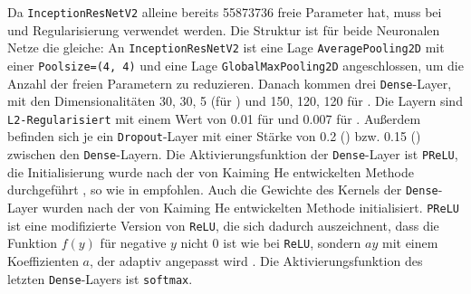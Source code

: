 Da \texttt{InceptionResNetV2} alleine bereits 55873736 freie Parameter hat, muss
bei \PreBig und \PreDog Regularisierung verwendet werden. Die Struktur ist für
beide Neuronalen Netze die gleiche: An \texttt{InceptionResNetV2} ist eine Lage
\texttt{AveragePooling2D} mit einer \texttt{Poolsize=(4, 4)} und eine Lage
\texttt{GlobalMaxPooling2D} angeschlossen, um die Anzahl der freien Parametern
zu reduzieren. Danach kommen drei \texttt{Dense}-Layer, mit den
Dimensionalitäten 30, 30, 5 (für \PreDog) und 150, 120, 120 für \PreBig. Die
Layern sind \texttt{L2-Regularisiert} mit einem Wert von 0.01 für \PreDog und
0.007 für \PreBig. Außerdem befinden sich je ein \texttt{Dropout}-Layer mit
einer Stärke von 0.2 (\PreDog) bzw. 0.15 (\PreBig) zwischen den
\texttt{Dense}-Layern. Die Aktivierungsfunktion der \texttt{Dense}-Layer ist
\texttt{PReLU}, die Initialisierung wurde nach der von Kaiming He entwickelten
Methode durchgeführt \cite{tensowflow-he}, so wie in \cite{he-ini} empfohlen.
Auch die Gewichte des Kernels der \texttt{Dense}-Layer wurden nach der von
Kaiming He entwickelten Methode initialisiert. \texttt{PReLU} ist eine
modifizierte Version von \texttt{ReLU}, die sich dadurch auszeichnent, dass die
Funktion $f(y)$ für negative $y$ nicht 0 ist wie bei \texttt{ReLU}, sondern $ay$
mit einem Koeffizienten $a$, der adaptiv angepasst wird \cite{prelu}. Die
Aktivierungsfunktion des letzten \texttt{Dense}-Layers ist \texttt{softmax}.
